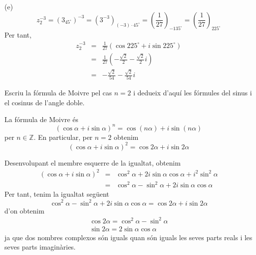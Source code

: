 \begin{solucio}
(e)
\begin{equation*}
z_{2}^{-3}=\left( 3_{45
^{\circ}
}\right) ^{-3}=\left( 3^{-3}\right) _{(-3)\cdot 45
^{\circ}
}=\left( \frac{1}{27}\right) _{-135
^{\circ}
}=\left( \frac{1}{27}\right) _{225
^{\circ}
}
\end{equation*}
Per tant,
\begin{eqnarray*}
z_{2}^{-3} &=&\frac{1}{27}(\cos 225
^{\circ}
+i\sin 225
^{\circ}
) \\
&=&\frac{1}{27}\left( -\frac{\sqrt{2}}{2}-\frac{\sqrt{2}}{2}i\right) \\
&=&-\frac{\sqrt{2}}{54}-\frac{\sqrt{2}}{54}i
\end{eqnarray*}
\end{solucio}

\begin{exemple}
Escriu la fórmula de Moivre pel cas $n=2$ i dedueix d’aquí
les fórmules del sinus i el cosinus de l’angle doble.
\end{exemple}

\begin{solucio}
La fórmula de Moivre és
\begin{equation*}
(\cos \alpha +i\sin \alpha )^{n}=\cos (n\alpha )+i\sin (n\alpha )
\end{equation*}
per $n\in \mathbb{Z}$. En particular, per $n=2$ obtenim
\begin{equation*}
(\cos \alpha +i\sin \alpha )^{2}=\cos 2\alpha +i\sin 2\alpha
\end{equation*}

Desenvolupant el membre esquerre de la igualtat, obtenim
\begin{eqnarray*}
(\cos \alpha +i\sin \alpha )^{2} &=&\cos ^{2}\alpha +2i\sin \alpha \cos
\alpha +i^{2}\sin ^{2}\alpha \\
&=&\cos ^{2}\alpha -\sin ^{2}\alpha +2i\sin \alpha \cos \alpha
\end{eqnarray*}
Per tant, tenim la igualtat següent
\begin{equation*}
\cos ^{2}\alpha -\sin ^{2}\alpha +2i\sin \alpha \cos \alpha =\cos 2\alpha
+i\sin 2\alpha
\end{equation*}
d’on obtenim
\begin{equation*}
\begin{array}{l}
\cos 2\alpha =\cos ^{2}\alpha -\sin ^{2}\alpha \\
\sin 2\alpha =2\sin \alpha \cos \alpha
\end{array}
\end{equation*}
ja que dos nombres complexos són iguals quan són iguals les seves parts reals i les seves parts imaginàries.
\end{solucio}

